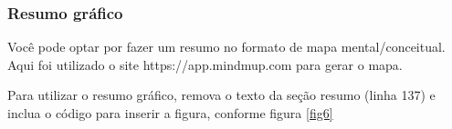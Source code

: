 \documentclass[	DIV=calc,%
							paper=a4,%
							fontsize=12pt,%
							onecolumn]{scrartcl}	 					%
\begin{document}










	



\subsubsection{Resumo gráfico}

Você pode optar por fazer um resumo no formato de mapa mental/conceitual. 
Aqui foi utilizado o site https://app.mindmup.com para gerar o mapa.

Para utilizar o resumo gráfico, remova o texto da seção resumo (linha 137) e inclua o código para inserir a figura, conforme figura \ref{fig6}
\end{document}
